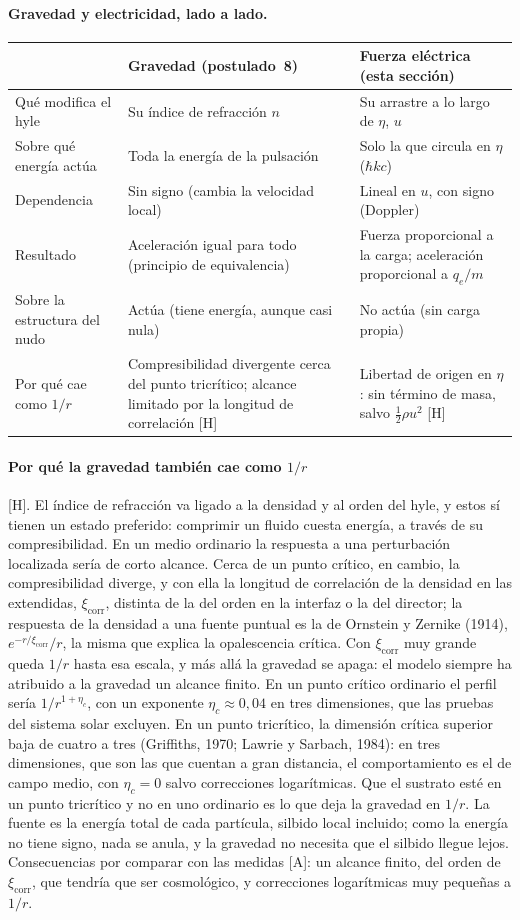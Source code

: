 \documentclass[11pt,a4paper]{article}
\newcommand{\st}[1]{\textup{[#1]}}
\newcommand{\apartado}[1]{\paragraph{#1}}
\begin{document}
\apartado{Gravedad y electricidad, lado a lado.}

\begin{center}
\small
\begin{tabularx}{\textwidth}{@{}>{\raggedright\arraybackslash}p{} Y Y@{}}
\toprule
 & Gravedad (postulado~8) & Fuerza eléctrica (esta sección) \\
\midrule
Qué modifica el hyle & Su índice de refracción $n$ & Su arrastre a lo largo de $\eta$, $u$ \\
Sobre qué energía actúa & Toda la energía de la pulsación & Solo la que circula en $\eta$ ($\hbar kc$) \\
Dependencia & Sin signo (cambia la velocidad local) & Lineal en $u$, con signo (Doppler) \\
Resultado & Aceleración igual para todo (principio de equivalencia) & Fuerza proporcional a la carga; aceleración proporcional a $q_e/m$ \\
Sobre la estructura del nudo & Actúa (tiene energía, aunque casi nula) & No actúa (sin carga propia) \\
Por qué cae como $1/r$ & Compresibilidad divergente cerca del punto tricrítico; alcance limitado por la longitud de correlación \st{H} & Libertad de origen en $\eta$: sin término de masa, salvo $\tfrac12\rho u^2$ \st{H} \\
\bottomrule
\end{tabularx}
\end{center}

\apartado{Por qué la gravedad también cae como $1/r$} \st{H}. El índice de refracción va ligado a la densidad y al orden del hyle, y estos sí tienen un estado preferido: comprimir un fluido cuesta energía, a través de su compresibilidad. En un medio ordinario la respuesta a una perturbación localizada sería de corto alcance. Cerca de un punto crítico, en cambio, la compresibilidad diverge, y con ella la longitud de correlación de la densidad en las extendidas, $\xi_{\mathrm{corr}}$, distinta de la del orden en la interfaz o la del director; la respuesta de la densidad a una fuente puntual es la de Ornstein y Zernike (1914), $e^{-r/\xi_{\mathrm{corr}}}/r$, la misma que explica la opalescencia crítica. Con $\xi_{\mathrm{corr}}$ muy grande queda $1/r$ hasta esa escala, y más allá la gravedad se apaga: el modelo siempre ha atribuido a la gravedad un alcance finito. En un punto crítico ordinario el perfil sería $1/r^{1+\eta_c}$, con un exponente $\eta_c\approx0{,}04$ en tres dimensiones, que las pruebas del sistema solar excluyen. En un punto tricrítico, la dimensión crítica superior baja de cuatro a tres (Griffiths, 1970; Lawrie y Sarbach, 1984): en tres dimensiones, que son las que cuentan a gran distancia, el comportamiento es el de campo medio, con $\eta_c=0$ salvo correcciones logarítmicas. Que el sustrato esté en un punto tricrítico y no en uno ordinario es lo que deja la gravedad en $1/r$. La fuente es la energía total de cada partícula, silbido local incluido; como la energía no tiene signo, nada se anula, y la gravedad no necesita que el silbido llegue lejos. Consecuencias por comparar con las medidas \st{A}: un alcance finito, del orden de $\xi_{\mathrm{corr}}$, que tendría que ser cosmológico, y correcciones logarítmicas muy pequeñas a $1/r$.
\end{document}

